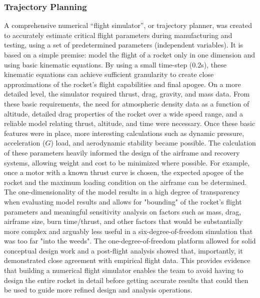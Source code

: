 \subsubsection{Trajectory Planning}\label{Trajectory Planning}
A comprehensive numerical “flight simulator”, or trajectory planner, was created to accurately estimate critical flight parameters during manufacturing and testing, using a set of predetermined parameters (independent variables). It is based on a simple premise: model the flight of a rocket only in one dimension and using basic kinematic equations. By using a small time-step (0.2s), these kinematic equations can achieve sufficient granularity to create close approximations of the rocket's flight capabilities and final apogee. 
\newline\newline
On a more detailed level, the simulator required thrust, drag, gravity, and mass data. From these basic requirements, the need for atmospheric density data as a function of altitude, detailed drag properties of the rocket over a wide speed range, and a reliable model relating thrust, altitude, and time were necessary. Once these basic features were in place, more interesting calculations such as dynamic pressure, acceleration ($G$) load, and aerodynamic stability became possible. The calculation of these parameters heavily informed the design of the airframe and recovery systems, allowing weight and cost to be minimized where possible. For example, once a motor with a known thrust curve is chosen, the expected apogee of the rocket and the maximum loading condition on the airframe can be determined.
\newline\newline
The one-dimensionality of the model results in a high degree of transparency when evaluating model results and allows for "bounding" of the rocket's flight parameters and meaningful sensitivity analysis on factors such as mass, drag, airframe size, burn time/thrust, and other factors that would be substantially more complex and arguably less useful in a six-degree-of-freedom simulation that was too far "into the weeds". The one-degree-of-freedom platform allowed for solid conceptual design work and a post-flight analysis showed that, importantly, it demonstrated close agreement with empirical flight data. This provides evidence that building a numerical flight simulator enables the team to avoid having to design the entire rocket in detail before getting accurate results that could then be used to guide more refined design and analysis operations.
